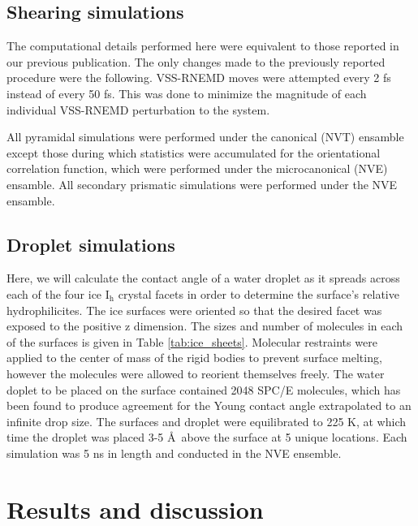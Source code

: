 \documentclass{pnastwo}
\begin{document}
\begin{article}
\subsection{Shearing simulations}

The computational details performed here were equivalent to those reported
in our previous publication\cite{Louden13}. The only changes made to the 
previously reported procedure were the following. VSS-RNEMD moves were 
attempted every 2 fs instead of every 50 fs. This was done to minimize
the magnitude of each individual VSS-RNEMD perturbation to the system.

All pyramidal simulations were performed under the canonical (NVT) ensamble 
except those
during which statistics were accumulated for the orientational correlation
function, which were performed under the microcanonical (NVE) ensamble. All 
secondary prismatic 
simulations were performed under the NVE ensamble. 

\subsection{Droplet simulations}
Here, we will calculate the contact angle of a water droplet as it spreads 
across each of the four ice I$_\mathrm{h}$ crystal facets in order to 
determine the surface's relative hydrophilicites. The ice surfaces were 
oriented so that the desired facet was exposed to the positive z dimension. 
The sizes and number of molecules in each of the surfaces is given in Table
\ref{tab:ice_sheets}. Molecular restraints were applied to the center of mass
of the rigid bodies to prevent surface melting, however the molecules were
allowed to reorient themselves freely. The water doplet to be placed on the
surface contained 2048 SPC/E molecules, which has been found to produce
agreement for the Young contact angle extrapolated to an infinite drop 
size\cite{Daub10}. The surfaces and droplet were equilibrated to 225 K, at 
which time the droplet was placed  3-5 \AA\ above the surface at 5 unique
locations. Each simulation was 5 ns in length and conducted in the NVE 
ensemble.  


\section{Results and discussion}

\end{article}
\end{document}
